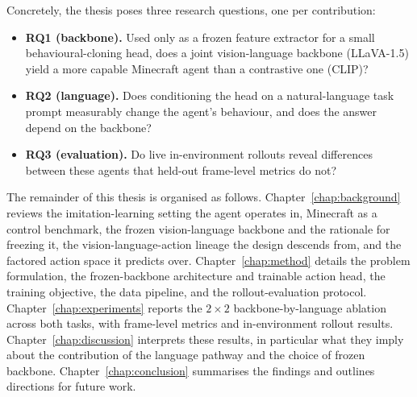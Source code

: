 Concretely, the thesis poses three research questions, one per contribution:
\begin{itemize}
\item \textbf{RQ1 (backbone).} Used only as a frozen feature extractor for a
small behavioural-cloning head, does a joint vision-language backbone
(LLaVA-1.5) yield a more capable Minecraft agent than a contrastive one (CLIP)?
\item \textbf{RQ2 (language).} Does conditioning the head on a natural-language
task prompt measurably change the agent's behaviour, and does the answer depend
on the backbone?
\item \textbf{RQ3 (evaluation).} Do live in-environment rollouts reveal
differences between these agents that held-out frame-level metrics do not?
\end{itemize}

The remainder of this thesis is organised as follows.
Chapter~\ref{chap:background} reviews the imitation-learning setting the
agent operates in, Minecraft as a control benchmark, the frozen
vision-language backbone and the rationale for freezing it, the
vision-language-action lineage the design descends from, and the factored
action space it predicts over. Chapter~\ref{chap:method} details the
problem formulation, the frozen-backbone architecture and trainable action
head, the training objective, the data pipeline, and the
rollout-evaluation protocol. Chapter~\ref{chap:experiments} reports the
$2\times2$ backbone-by-language ablation across both tasks, with
frame-level metrics and in-environment rollout results.
Chapter~\ref{chap:discussion} interprets these results, in particular what
they imply about the contribution of the language pathway and the choice
of frozen backbone. Chapter~\ref{chap:conclusion} summarises the findings
and outlines directions for future work.

